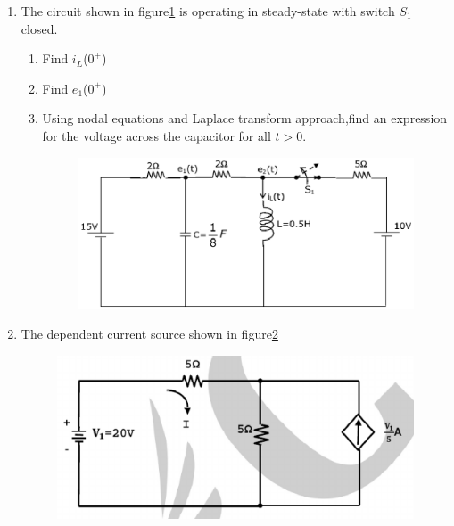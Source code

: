 \documentclass[journal,12pt,twocolumn]{IEEEtran}
\begin{document}
\begin{enumerate}
\item The circuit shown in figure\ref{fig41} is operating in steady-state with switch $S_{1}$ closed. 
\begin{enumerate}
\setlength\itemsep{2em}
\item Find $i_{L}$($0^{+}$)
\item Find $e_{1}$($0^{+}$)
\item Using nodal equations and Laplace transform approach,find an expression for the voltage across the capacitor for all $t>0$.
\begin{figure}[!h]
\begin{center}
\includegraphics[scale=0.4]{./figs/fig41.eps}
\caption{}
\label{fig41}
\end{center}
\end{figure}
\end{enumerate}

\item The dependent current source shown in figure\ref{fig42} 
\begin{enumerate}
\setlength\itemsep{2em}
\begin{figure}[!h]
\begin{center}
\includegraphics[scale=0.5]{./figs/fig42.eps}
\caption{}
\label{fig42}
\end{center}
\end{figure}
\end{enumerate}


\end{enumerate}
\end{document}
